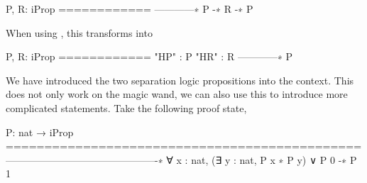 \documentclass[thesis.tex]{subfiles}
\begin{document}
\begin{coqcode}
  P, R: iProp
  ============
  ------------∗
  P -∗ R -∗ P
\end{coqcode}
When using , this transforms into
\begin{coqcode}
  P, R: iProp
  ============
  "HP" : P
  "HR" : R
  ------------∗
  P
\end{coqcode}
We have introduced the two separation logic propositions into the \iris context. This does not only work on the magic wand, we can also use this to introduce more complicated statements. Take the following proof state,
\begin{coqcode}
  P: nat → iProp
  ==============================================
  ----------------------------------------------∗
  ∀ x : nat, (∃ y : nat, P x ∗ P y) ∨ P 0 -∗ P 1
\end{coqcode}
\end{document}

